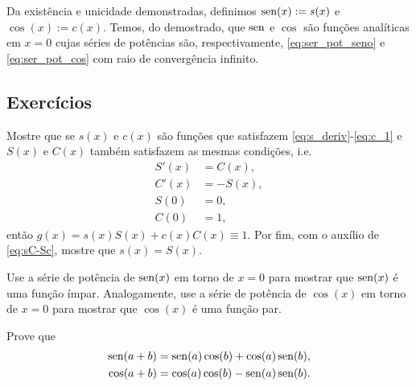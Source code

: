 Da existência e unicidade demonstradas, definimos $\operatorname{sen}(x) := s(x)$ e $\cos(x) := c(x)$. Temos, do demostrado, que $\operatorname{sen}$ e $\cos$ são funções analíticas em $x=0$ cujas séries de potências são,  respectivamente, \eqref{eq:ser_pot_seno} e \eqref{eq:ser_pot_cos} com raio de convergência infinito. 

\subsection*{Exercícios}

\begin{exer}
  Mostre que se $s(x)$ e $c(x)$ são funções que satisfazem \eqref{eq:s_deriv}-\eqref{eq:c_1} e $S(x)$ e $C(x)$ também satisfazem as mesmas condições, i.e.
\begin{align}
  S'(x) &= C(x),\label{eq:s_deriv}\\
  C'(x) &= -S(x),\label{eq:c_deriv}\\
  S(0) &= 0,\label{eq:s_0}\\
  C(0) &= 1,\label{eq:c_1}
\end{align}
então $g(x) = s(x)S(x)+c(x)C(x) \equiv 1$. Por fim, com o auxílio de \eqref{eq:sC-Sc}, mostre que $s(x) = S(x)$.
\end{exer}

\begin{exer}
  Use a série de potência de $\operatorname{sen}(x)$ em torno de $x=0$ para mostrar que $\operatorname{sen}(x)$ é uma função ímpar. Analogamente, use a série de potência de $\cos(x)$ em torno de $x=0$ para mostrar que $\cos(x)$ é uma função par.
\end{exer}

\begin{exer}
  Prove que
  \begin{align}
    \operatorname{sen}(a+b)&=\operatorname{sen}(a)\cos(b)+\cos(a)\operatorname{sen}(b),\\
    \cos(a+b)&=\cos(a)\cos(b)-\operatorname{sen}(a)\operatorname{sen}(b).
  \end{align}
\end{exer}


